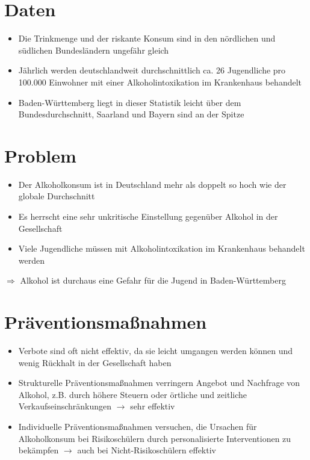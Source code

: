 \documentclass[12pt]{article}
\begin{document}
 \section{Daten}
 \begin{itemize}
    \item Die Trinkmenge und der riskante Konsum sind in den nördlichen und südlichen Bundesländern ungefähr gleich
    \item Jährlich werden deutschlandweit durchschnittlich ca. 26 Jugendliche pro 100.000 Einwohner mit einer Alkoholintoxikation im Krankenhaus behandelt
    \item Baden-Württemberg liegt in dieser Statistik leicht über dem Bundesdurchschnitt, Saarland und Bayern sind an der Spitze
 \end{itemize}
 
 \section{Problem}
 \begin{itemize}
    \item Der Alkoholkonsum ist in Deutschland mehr als doppelt so hoch wie der globale Durchschnitt
    \item Es herrscht eine sehr unkritische Einstellung gegenüber Alkohol in der Gesellschaft
    \item Viele Jugendliche müssen mit Alkoholintoxikation im Krankenhaus behandelt werden
 \end{itemize}
 \par$\Rightarrow$ Alkohol ist durchaus eine Gefahr für die Jugend in Baden-Württemberg

 \section{Präventionsmaßnahmen}
 \begin{itemize}
    \item Verbote sind oft nicht effektiv, da sie leicht umgangen werden können und wenig Rückhalt in der Gesellschaft haben
    \item Strukturelle Präventionsmaßnahmen verringern Angebot und Nachfrage von Alkohol, z.B. durch höhere Steuern oder örtliche und zeitliche Verkaufseinschränkungen $\rightarrow$ sehr effektiv
    \item Individuelle Präventionsmaßnahmen versuchen, die Ursachen für Alkoholkonsum bei Risikoschülern durch personalisierte Interventionen zu bekämpfen $\rightarrow$ auch bei Nicht-Risikoschülern effektiv
\end{itemize}
\vspace{0.5cm}
\end{document}
